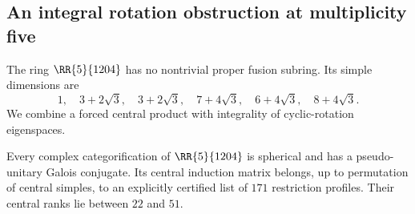 \subsection{An integral rotation obstruction at multiplicity five}
\label{sec:1204-exclusion}

The ring $\RR{5}{1204}$ has no nontrivial proper fusion subring. Its
simple dimensions are
\[
 1,\quad3+2\sqrt3,\quad3+2\sqrt3,\quad7+4\sqrt3,
 \quad6+4\sqrt3,\quad8+4\sqrt3.
\]
We combine a forced central product with integrality of cyclic-rotation
eigenspaces.

\begin{proposition}\label{prop:1204-finite-profiles}
Every complex categorification of $\RR{5}{1204}$ is spherical and has a
pseudo-unitary Galois conjugate. Its central induction matrix belongs,
up to permutation of central simples, to an explicitly certified list of
$171$ restriction profiles. Their central ranks lie between $22$ and $51$.

\end{proposition}

